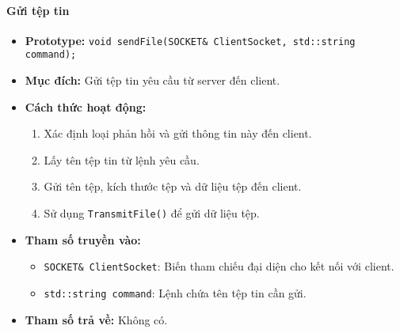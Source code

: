 \paragraph{\textbf{Gửi tệp tin}}
\begin{itemize}
    \item \textbf{Prototype:} \texttt{void sendFile(SOCKET\& ClientSocket, std::string command);}
    
    \item \textbf{Mục đích:} Gửi tệp tin yêu cầu từ server đến client.
    
    \item \textbf{Cách thức hoạt động:} 
    \begin{enumerate}
        \item Xác định loại phản hồi và gửi thông tin này đến client.
        \item Lấy tên tệp tin từ lệnh yêu cầu.
        \item Gửi tên tệp, kích thước tệp và dữ liệu tệp đến client.
        \item Sử dụng \texttt{TransmitFile()} để gửi dữ liệu tệp.
    \end{enumerate}
    
    \item \textbf{Tham số truyền vào:} 
    \begin{itemize}
        \item \texttt{SOCKET\& ClientSocket}: Biến tham chiếu đại diện cho kết nối với client.
        \item \texttt{std::string command}: Lệnh chứa tên tệp tin cần gửi.
    \end{itemize}
    
    \item \textbf{Tham số trả về:} Không có.
\end{itemize}

